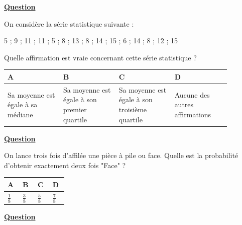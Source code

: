 \documentclass[oneside,12pt]{article}
\begin{document}
\newpage
\underline{\textbf{Question }}

On considère la série statistique suivante :
\begin{center}
	5 ; 9 ; 11 ; 11 ; 5 ; 8 ; 13 ; 8 ; 14 ; 15 ; 6 ; 14 ; 8 ; 12 ; 15
\end{center}

Quelle affirmation est vraie concernant cette série statistique ?

\begin{center}
	\renewcommand{\arraystretch}{1.35}
	\begin{tabular}{| P{0.22\linewidth} | P{0.22\linewidth} | P{0.22\linewidth} | P{0.22\linewidth} |} \hline
	A & B & C & D \\ \hline
	\vspace*{-5pt} Sa moyenne est égale à sa médiane & \vspace*{-5pt} Sa moyenne est égale à son premier quartile & Sa moyenne est égale à son troisième quartile & \vspace*{-5pt} Aucune des autres affirmations \\ \hline
	\end{tabular}
\end{center}



\underline{\textbf{Question }}

On lance trois fois d'affilée une pièce à pile ou face. Quelle est la probabilité d'obtenir exactement deux fois "Face" ?

\begin{center}
	\renewcommand{\arraystretch}{1.35}
	\begin{tabular}{| P{0.22\linewidth} | P{0.22\linewidth} | P{0.22\linewidth} | P{0.22\linewidth} |} \hline
	A & B & C & D \\ \hline
	\rule{0pt}{5mm}
	$\frac{1}{8}$ & $\frac{3}{8}$ & $\frac{5}{8}$ & $\frac{7}{8}$ \\[2pt] \hline
	\end{tabular}
\end{center}



\underline{\textbf{Question }}
\end{document}

